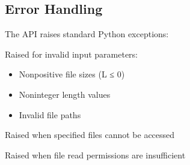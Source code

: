 \documentclass[letterpaper,10pt,english]{sphinxmanual}
\begin{document}
\subsection{Error Handling}
\label{\detokenize{api_reference:error-handling}}
\sphinxAtStartPar
The API raises standard Python exceptions:

\begin{fulllineitems}
\label{\detokenize{api_reference:CLF_MAXIMAL_VALIDATOR_FINAL.ValueError}}
\pysigstartsignatures
\pysigline
{}
\pysigstopsignatures
\sphinxAtStartPar
Raised for invalid input parameters:
\begin{itemize}
\item {} 
\sphinxAtStartPar
Non\sphinxhyphen{}positive file sizes (L ≤ 0)

\item {} 
\sphinxAtStartPar
Non\sphinxhyphen{}integer length values

\item {} 
\sphinxAtStartPar
Invalid file paths

\end{itemize}

\end{fulllineitems}


\begin{fulllineitems}
\label{\detokenize{api_reference:CLF_MAXIMAL_VALIDATOR_FINAL.FileNotFoundError}}
\pysigstartsignatures
\pysigline
{}
\pysigstopsignatures
\sphinxAtStartPar
Raised when specified files cannot be accessed

\end{fulllineitems}


\begin{fulllineitems}
\label{\detokenize{api_reference:CLF_MAXIMAL_VALIDATOR_FINAL.PermissionError}}
\pysigstartsignatures
\pysigline
{}
\pysigstopsignatures
\sphinxAtStartPar
Raised when file read permissions are insufficient

\end{fulllineitems}
\end{document}

